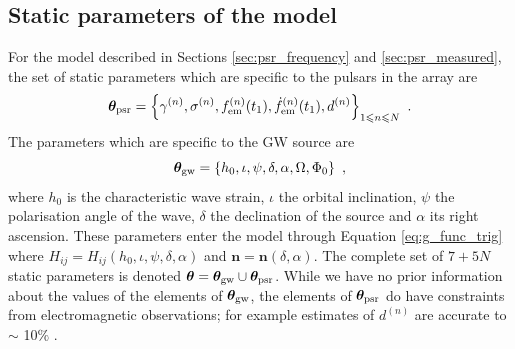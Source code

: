 \documentclass[fleqn,usenatbib,useAMS]{mnras}
\begin{document}
\subsection{Static parameters of the model}\label{sec:ss_params}
For the model described in Sections \ref{sec:psr_frequency} and \ref{sec:psr_measured}, the set of static parameters which are specific to the pulsars in the array are
\begin{equation}
	\boldsymbol{\theta}_{\rm psr} = \left \{ \gamma^{(n)},\sigma^{(n)}, f_{\rm em}^{(n)}(t_1),\dot{f}_{\rm em}^{(n)}(t_1),d^{(n)}\right\}_{1\leq n \leq N} \ .  \label{eq:psrparams}
\end{equation}
The parameters which are specific to the GW source are 
\begin{equation}
	\boldsymbol{\theta}_{\rm gw} = \left \{h_0, \iota, \psi, \delta, \alpha, \Omega, \Phi_0 \right \} \ ,  \label{eq:params3}
\end{equation}
where $h_0$ is the characteristic wave strain, $\iota$ the orbital inclination, $\psi$ the polarisation angle of the wave, $\delta$ the declination of the source and $\alpha$ its right ascension. These parameters enter the model through Equation \eqref{eq:g_func_trig} where $H_{ij} = H_{ij}(h_0, \iota, \psi, \delta, \alpha)$ and $\boldsymbol{n}=\boldsymbol{n}(\delta,\alpha)$. The complete set of $7 + 5N$ static parameters is denoted $\boldsymbol{\theta} = \boldsymbol{\theta}_{\rm gw} \cup \boldsymbol{\theta}_{\rm psr}$. While we have no prior information about the values of the elements of $\boldsymbol{\theta}_{\rm gw}$, the elements of $\boldsymbol{\theta}_{\rm psr}$
do have constraints from electromagnetic observations; for example estimates of $d^{(n)}$ are accurate to $\sim$ 10$\%$ \citep{Cordes2002astro.ph..7156C, Verbiest2012ApJ...755...39V, Desvignes2016,Yao2017}.
\end{document}

